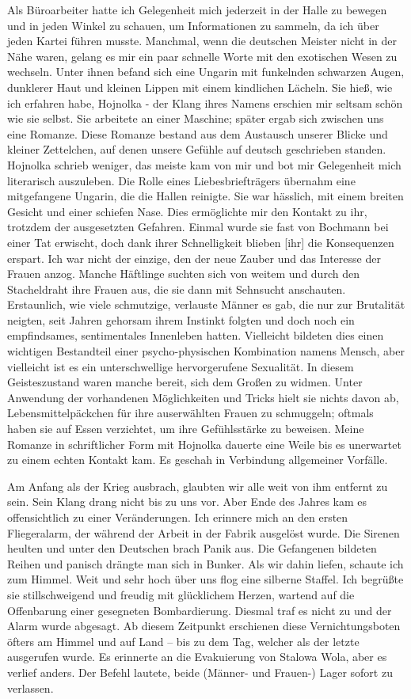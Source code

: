 \documentclass[a4paper,12pt,ngerman,
]{nisebook}
\begin{document}
Als Büroarbeiter hatte ich Gelegenheit mich jederzeit in der Halle zu bewegen und in jeden Winkel zu schauen, um Informationen zu sammeln, da ich über jeden Kartei führen musste. Manchmal, wenn die deutschen Meister nicht in der Nähe waren, gelang es mir ein paar schnelle Worte mit den exotischen Wesen zu wechseln. Unter ihnen befand sich eine Ungarin mit funkelnden schwarzen Augen, dunklerer Haut und kleinen Lippen mit einem kindlichen Lächeln. Sie hieß, wie ich erfahren habe, Hojnolka - der Klang ihres Namens erschien mir seltsam schön wie sie selbst. Sie arbeitete an einer Maschine; später ergab sich zwischen uns eine Romanze. Diese Romanze bestand aus dem Austausch unserer Blicke und kleiner Zettelchen, auf denen unsere Gefühle auf deutsch geschrieben standen.
Hojnolka schrieb weniger, das meiste kam von mir und bot mir Gelegenheit mich literarisch auszuleben. Die Rolle eines Liebesbriefträgers übernahm eine mitgefangene Ungarin, die die Hallen reinigte. Sie war hässlich, mit einem breiten Gesicht und einer schiefen Nase. Dies ermöglichte mir den Kontakt zu ihr, trotzdem der ausgesetzten Gefahren. Einmal wurde sie fast von Bochmann bei einer Tat erwischt, doch dank ihrer Schnelligkeit blieben [ihr] die Konsequenzen erspart.
Ich war nicht der einzige, den der neue Zauber und das Interesse der Frauen anzog. Manche Häftlinge suchten sich von weitem und durch den Stacheldraht ihre Frauen aus, die sie dann mit Sehnsucht anschauten. Erstaunlich, wie viele schmutzige, verlauste Männer es gab, die nur zur Brutalität neigten, seit Jahren gehorsam ihrem Instinkt folgten und doch noch ein empfindsames, sentimentales Innenleben hatten. Vielleicht bildeten dies einen wichtigen Bestandteil einer psycho-physischen Kombination namens Mensch, aber vielleicht ist es ein unterschwellige hervorgerufene Sexualität. In diesem Geisteszustand waren manche bereit, sich dem Großen zu widmen. Unter Anwendung der vorhandenen Möglichkeiten und Tricks hielt sie nichts davon ab, Lebensmittelpäckchen für ihre auserwählten Frauen zu schmuggeln; oftmals haben sie auf Essen verzichtet, um ihre Gefühlsstärke zu beweisen.
Meine Romanze in schriftlicher Form mit Hojnolka dauerte eine Weile bis es unerwartet zu einem echten Kontakt kam. Es geschah in Verbindung allgemeiner Vorfälle. 

Am Anfang als der Krieg ausbrach, glaubten wir alle weit von ihm entfernt zu sein. Sein Klang drang nicht bis zu uns vor. Aber Ende des Jahres kam es offensichtlich zu einer Veränderungen. Ich erinnere mich an den ersten Fliegeralarm, der während der Arbeit in der Fabrik ausgelöst wurde. Die Sirenen heulten und unter den Deutschen brach Panik aus. Die Gefangenen bildeten Reihen und panisch drängte man sich in Bunker. Als wir dahin liefen, schaute ich zum Himmel. Weit und sehr hoch über uns flog eine silberne Staffel. Ich begrüßte sie stillschweigend und freudig mit glücklichem Herzen, wartend auf die Offenbarung einer gesegneten Bombardierung. Diesmal traf es nicht zu und der Alarm wurde abgesagt. Ab diesem Zeitpunkt erschienen diese Vernichtungsboten öfters am Himmel und auf Land -- bis zu dem Tag, welcher als der letzte ausgerufen wurde.
Es erinnerte an die Evakuierung von Stalowa Wola, aber es verlief anders. Der Befehl lautete, beide (Männer- und Frauen-) Lager sofort zu verlassen.
\end{document}
